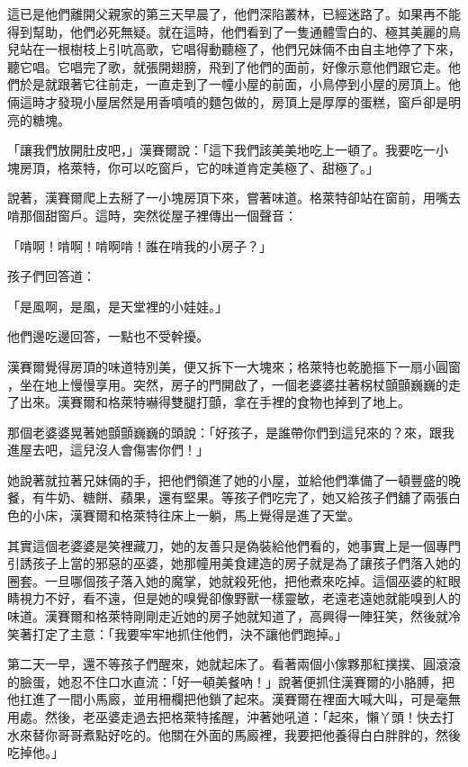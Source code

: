 \documentclass[oneside,11pt]{memoir} %
\begin{document}
這已是他們離開父親家的第三天早晨了，他們深陷叢林，已經迷路了。如果再不能
得到幫助，他們必死無疑。就在這時，他們看到了一隻通體雪白的、極其美麗的鳥
兒站在一根樹枝上引吭高歌，它唱得動聽極了，他們兄妹倆不由自主地停了下來，
聽它唱。它唱完了歌，就張開翅膀，飛到了他們的面前，好像示意他們跟它走。他
們於是就跟著它往前走，一直走到了一幢小屋的前面，小鳥停到小屋的房頂上。他
倆這時才發現小屋居然是用香噴噴的麵包做的，房頂上是厚厚的蛋糕，窗戶卻是明
亮的糖塊。

「讓我們放開肚皮吧，」漢賽爾說：「這下我們該美美地吃上一頓了。我要吃一小
塊房頂，格萊特，你可以吃窗戶，它的味道肯定美極了、甜極了。」

說著，漢賽爾爬上去掰了一小塊房頂下來，嘗著味道。格萊特卻站在窗前，用嘴去
啃那個甜窗戶。這時，突然從屋子裡傳出一個聲音：

「啃啊！啃啊！啃啊啃！誰在啃我的小房子？」

孩子們回答道：

「是風啊，是風，是天堂裡的小娃娃。」

他們邊吃邊回答，一點也不受幹擾。

漢賽爾覺得房頂的味道特別美，便又拆下一大塊來；格萊特也乾脆摳下一扇小圓窗
，坐在地上慢慢享用。突然，房子的門開啟了，一個老婆婆拄著柺杖顫顫巍巍的走
了出來。漢賽爾和格萊特嚇得雙腿打顫，拿在手裡的食物也掉到了地上。

那個老婆婆晃著她顫顫巍巍的頭說：「好孩子，是誰帶你們到這兒來的？來，跟我
進屋去吧，這兒沒人會傷害你們！」

她說著就拉著兄妹倆的手，把他們領進了她的小屋，並給他們準備了一頓豐盛的晚
餐，有牛奶、糖餅、蘋果，還有堅果。等孩子們吃完了，她又給孩子們舖了兩張白
色的小床，漢賽爾和格萊特往床上一躺，馬上覺得是進了天堂。

其實這個老婆婆是笑裡藏刀，她的友善只是偽裝給他們看的，她事實上是一個專門
引誘孩子上當的邪惡的巫婆，她那幢用美食建造的房子就是為了讓孩子們落入她的
圈套。一旦哪個孩子落入她的魔掌，她就殺死他，把他煮來吃掉。這個巫婆的紅眼
睛視力不好，看不遠，但是她的嗅覺卻像野獸一樣靈敏，老遠老遠她就能嗅到人的
味道。漢賽爾和格萊特剛剛走近她的房子她就知道了，高興得一陣狂笑，然後就冷
笑著打定了主意：「我要牢牢地抓住他們，決不讓他們跑掉。」

第二天一早，還不等孩子們醒來，她就起床了。看著兩個小傢夥那紅撲撲、圓滾滾
的臉蛋，她忍不住口水直流：「好一頓美餐吶！」說著便抓住漢賽爾的小胳膊，把
他扛進了一間小馬廄，並用柵欄把他鎖了起來。漢賽爾在裡面大喊大叫，可是毫無
用處。然後，老巫婆走過去把格萊特搖醒，沖著她吼道：「起來，懶丫頭！快去打
水來替你哥哥煮點好吃的。他關在外面的馬廄裡，我要把他養得白白胖胖的，然後
吃掉他。」
\end{document}
